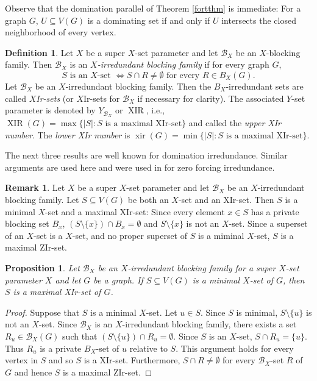 \documentclass{article}
\numberwithin{figure}{section}
\numberwithin{table}{section}
\numberwithin{equation}{section}
\newtheorem{prop}[thm]{Proposition}
\theoremstyle{definition}
\newtheorem{rem}[thm]{Remark}
\theoremstyle{definition}
\newtheorem{defn}[thm]{Definition}
\theoremstyle{definition}
\newcommand{\B}{\mathcal{B}}
\newcommand{\beq}{\begin{equation}}
\newcommand{\eeq}{\end{equation}}
\newcommand{\bpf}{\begin{proof}}
\newcommand{\epf}{\end{proof}\ms}
\newcommand{\ms}{\medskip}
\DeclareMathOperator{\xir}{xir}
\DeclareMathOperator{\XIR}{XIR}
\begin{document}
Observe that the domination parallel of Theorem \ref{fortthm} is immediate:  For a graph $G$, $U\subseteq V(G)$ is a dominating set if and only if $U$ intersects the closed neighborhood of every vertex.



\begin{defn}\label{d:Xirred} Let $X$ be a super $X$-set parameter and let $ \B_X$ be an $X$-blocking family. Then $ \B_X$ is an \emph{$X$-irredundant blocking family} if for every graph $G$,
\beq\label{d-eq:irred} S\mbox{ is an $X$-set }\Leftrightarrow S\cap R\ne \emptyset\mbox{ for every }R\in B_X(G).\eeq 
Let  $ \B_X$ be an $X$-irredundant blocking family.  Then the $B_X$-irredundant sets are called \emph{$X$Ir-sets}  (or $X$Ir-sets for $\B_X$ if necessary for clarity).  The associated $Y$-set parameter is denoted by $Y_{\B_X}$ or $\XIR$, i.e.,  $\XIR(G)=\max\{|S|: S\mbox{ is a maximal XIr-set}\}$ and called the \emph{upper XIr number}.  The  \emph{lower XIr number} is $\xir(G)=\min\{|S|: S\mbox{ is a maximal XIr-set}\}$. 
\end{defn}

 The next  three results are well known for domination irredundance.  Similar arguments are used here and were used in \cite{ZIR} for zero forcing irredundance.


\begin{rem}\label{r:X+XIr} Let $X$ be a  super $X$-set parameter and let $ \B_X$ be an $X$-irredundant blocking family.  
Let $S\subseteq V(G)$   be both an $X$-set and an XIr-set. Then  $S$ is a minimal $X$-set and a maximal XIr-set: Since every element $x\in S$ has a private blocking set $B_x$, $(S \setminus \{x\})\cap B_x=\emptyset$ and $S \setminus \{x\}$ is not an $X$-set. Since a superset of an $X$-set is a $X$-set, and no proper superset of $S$ is a miminal $X$-set, $S$ is a maximal ZIr-set.
\end{rem}



\begin{prop}\label{p:Xmin-XIrmax}
    Let  $ \B_X$ be an $X$-irredundant blocking family for a  super $X$-set parameter $X$ and let $G$ be a graph. If $S\subseteq V(G)$ is a minimal $X$-set of $G$, then  $S$ is a maximal XIr-set of $G$.
\end{prop}
\bpf 
Suppose that $S$ is a minimal $X$-set. Let $u\in S$. Since $S$ is minimal, $S \setminus \{u\}$ is not an $X$-set. Since $\B_X$ is an $X$-irredundant blocking family, there exists a set $R_u\in \B_X(G)$ such that $(S \setminus \{u\})\cap R_u=\emptyset$.  Since $S$ is an $X$-set,  $S\cap R_u =\{u\}$. Thus $R_u$ is a private $B_X$-set of $u$ relative to $S$. This argument holds for every vertex in $S$ and so $S$ is a XIr-set. 
Furthermore, $S\cap R\ne\emptyset$ for every $\B_X$-set $R$ of $G$ and hence $S$ is a maximal ZIr-set.
\epf
\end{document}
